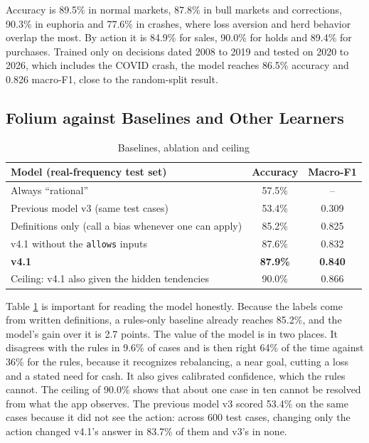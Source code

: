 Accuracy is 89.5\% in normal markets, 87.8\% in bull markets and corrections, 90.3\% in euphoria and 77.6\% in crashes, where loss aversion and herd behavior overlap the most. By action it is 84.9\% for sales, 90.0\% for holds and 89.4\% for purchases. Trained only on decisions dated 2008 to 2019 and tested on 2020 to 2026, which includes the COVID crash, the model reaches 86.5\% accuracy and 0.826 macro-F1, close to the random-split result.

\subsection{Folium against Baselines and Other Learners}
\begin{table}[H]
\centering
\small
\begin{tabular}{|l|c|c|}
\hline
\textbf{Model (real-frequency test set)} & \textbf{Accuracy} & \textbf{Macro-F1} \\
\hline
Always ``rational'' & 57.5\% & -- \\
\hline
Previous model v3 (same test cases) & 53.4\% & 0.309 \\
\hline
Definitions only (call a bias whenever one can apply) & 85.2\% & 0.825 \\
\hline
v4.1 without the \texttt{allows} inputs & 87.6\% & 0.832 \\
\hline
\textbf{v4.1} & \textbf{87.9\%} & \textbf{0.840} \\
\hline
Ceiling: v4.1 also given the hidden tendencies & 90.0\% & 0.866 \\
\hline
\end{tabular}
\caption{Baselines, ablation and ceiling}
\label{tab:baselines}
\end{table}

Table \ref{tab:baselines} is important for reading the model honestly. Because the labels come from written definitions, a rules-only baseline already reaches 85.2\%, and the model's gain over it is 2.7 points. The value of the model is in two places. It disagrees with the rules in 9.6\% of cases and is then right 64\% of the time against 36\% for the rules, because it recognizes rebalancing, a near goal, cutting a loss and a stated need for cash. It also gives calibrated confidence, which the rules cannot. The ceiling of 90.0\% shows that about one case in ten cannot be resolved from what the app observes. The previous model v3 scored 53.4\% on the same cases because it did not see the action: across 600 test cases, changing only the action changed v4.1's answer in 83.7\% of them and v3's in none.


